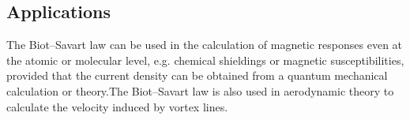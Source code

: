 \subsection{Applications}
The Biot–Savart law can be used in the calculation of magnetic responses even at the atomic or molecular level, e.g. chemical shieldings or magnetic susceptibilities, provided that the current density can be obtained from a quantum mechanical calculation or theory.The Biot–Savart law is also used in aerodynamic theory to calculate the velocity induced by vortex lines.\cite{webref1}



